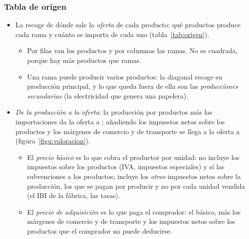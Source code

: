 \documentclass[11pt]{article}
\begin{document}
\subsubsection{Tabla de origen}\label{sec:origen}

\begin{itemize}
\item La  recoge de dónde sale la \emph{oferta} de cada producto: qué productos produce cada rama y cuánto se importa de cada uno (tabla~\ref{tab:origen}).
  \begin{itemize}
  \item Por filas van los productos y por columnas las ramas. No es cuadrada, porque hay más productos que ramas.
  \item Una rama puede producir varios productos: la diagonal recoge su producción principal, y lo que queda fuera de ella son las \emph{producciones secundarias} (la electricidad que genera una papelera).
  \end{itemize}
\item \emph{De la producción a la oferta}: la producción por productos más las importaciones da la oferta a ; añadiendo los impuestos netos sobre los productos y los márgenes de comercio y de transporte se llega a la oferta a  (figura~\ref{figu:valoracion}).
  \begin{itemize}
  \item El \emph{precio básico} es lo que cobra el productor por unidad: no incluye los impuestos sobre los productos (IVA, impuestos especiales) y sí las subvenciones a los productos; incluye los \emph{otros} impuestos netos sobre la producción, los que se pagan por producir y no por cada unidad vendida (el IBI de la fábrica, las tasas)\nocite{Eurostat2013SEC2010}.
  \item El \emph{precio de adquisición} es lo que paga el comprador: el básico, más los márgenes de comercio y de transporte y los impuestos netos sobre los productos que el comprador no puede deducirse.
  \end{itemize}
\end{itemize}
\end{document}
